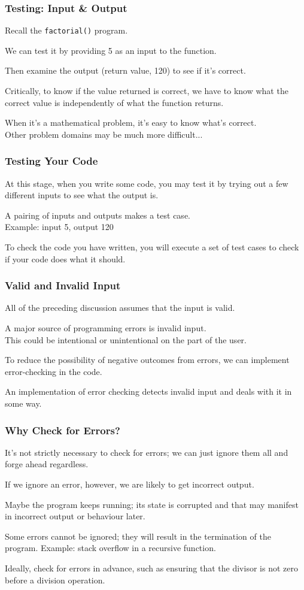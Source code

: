 \begin{frame}
\frametitle{Testing: Input \& Output}
Recall the \texttt{factorial()} program.

We can test it by providing 5 as an input to the function.

Then examine the output (return value, 120) to see if it's correct.

Critically, to know if the value returned is correct, we have to know what the correct value is independently of what the function returns.

When it's a mathematical problem, it's easy to know what's correct.\\
\quad Other problem domains may be much more difficult...

\end{frame}

\begin{frame}
\frametitle{Testing Your Code}
At this stage, when you write some code, you may test it by trying out a few different inputs to see what the output is.

A pairing of inputs and outputs makes a \alert{test case}.\\
\quad Example: input 5, output 120

To check the code you have written, you will execute a set of test cases to check if your code does what it should. 

\end{frame}

\begin{frame}
\frametitle{Valid and Invalid Input}
All of the preceding discussion assumes that the input is valid.

A major source of programming errors is invalid input.\\
\quad This could be intentional or unintentional on the part of the user.

To reduce the possibility of negative outcomes from errors, we can implement \alert{error-checking} in the code.

An implementation of error checking detects invalid input and deals with it in some way.

\end{frame}

\begin{frame}
\frametitle{Why Check for Errors?}

It's not strictly necessary to check for errors; we can just ignore them all and forge ahead regardless.

If we ignore an error, however, we are likely to get incorrect output. 

Maybe the program keeps running; its state is corrupted and that may manifest in incorrect output or behaviour later.

Some errors cannot be ignored; they will result in the termination of the program. Example: stack overflow in a recursive function.

Ideally, check for errors in advance, such as ensuring that the divisor is not zero before a division operation.


\end{frame}

